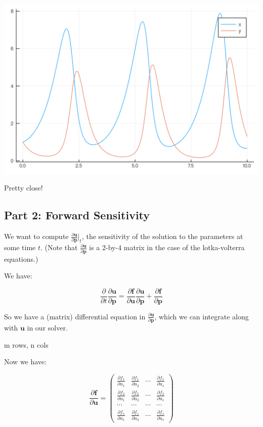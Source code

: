 \documentclass[nobib]{tufte-handout}
\newcommand{\fv}[0]{\mathbf{f}}
\newcommand{\uv}[0]{\mathbf{u}}
\newcommand{\pv}[0]{\mathbf{p}}
\begin{document}
\begin{center}
\includegraphics[width=.9\linewidth]{./.ob-jupyter/dc7fae37e0dfe8d7652748ee8251f0030fd7b5cd.png}
\end{center}

Pretty close!

\subsection{Part 2: Forward Sensitivity}
\label{sec:orgeb9559c}

We want to compute \(\frac{\partial \uv}{\partial \pv}|_t\), the sensitivity of the solution to the parameters at some time \(t\).
(Note that \(\frac{\partial \uv}{\partial \pv}\) is a 2-by-4 matrix in the case of the lotka-volterra equations.)

We have:

$$\frac{\partial}{\partial t}\frac{\partial \uv}{\partial \pv}
   =\frac{\partial \fv}{\partial \uv}\frac{\partial \uv}{\partial \pv}+\frac{\partial \fv}{\partial \pv}$$

So we have a (matrix) differential equation in \(\frac{\partial \uv}{\partial \pv}\), which we can integrate along with \(\uv\) in our solver.

m rows, n cols

Now we have:

$$\frac{\partial \fv}{\partial \uv}
   =\left(\begin{array}{cccc}
     \frac{\partial f_{1}}{\partial u_{1}} & \frac{\partial f_{1}}{\partial u_{2}} & \cdots & \frac{\partial f_{1}}{\partial u_{s}}\\
     \frac{\partial f_{2}}{\partial u_{1}} & \frac{\partial f_{2}}{\partial u_{2}} & \cdots & \frac{\partial f_{2}}{\partial u_{s}}\\
     \cdots & \cdots & \cdots & \cdots\\
     \frac{\partial f_{s}}{\partial u_{1}} & \frac{\partial f_{s}}{\partial u_{2}} & \cdots & \frac{\partial f_{s}}{\partial u_{s}}
   \end{array}\right)$$
\end{document}
